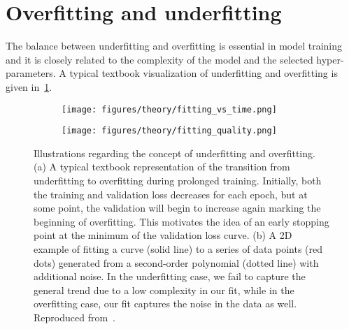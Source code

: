 \section{Overfitting and underfitting}\label{sec:under_over_fit}

The balance between underfitting and overfitting is essential in model training
and it is closely related to the complexity of the model and the selected
hyper-parameters. A typical textbook visualization of underfitting and
overfitting is given in~\cref{fig:fitting_vs_time}. 


\begin{figure}[!htb]
  \centering
  \begin{subfigure}[t]{0.42\textwidth}
    \centering
    \texttt{[image: figures/theory/fitting\_vs\_time.png]}
    \caption{}
    \label{fig:fitting_vs_time}
  \end{subfigure}
  \hfill
  \begin{subfigure}[t]{0.57\textwidth}
    \centering
    \texttt{[image: figures/theory/fitting\_quality.png]}
    \caption{}
    \label{fig:fitting_quality}
  \end{subfigure}
  \hfill
  \caption{Illustrations regarding the concept of underfitting and overfitting. (a) A typical textbook representation of the transition from underfitting to overfitting during prolonged training. Initially, both the training and validation loss decreases for each epoch, but at some point, the validation will begin to increase again marking the beginning of overfitting. This motivates the idea of an early stopping point at the minimum of the validation loss curve. (b) A 2D example of fitting a curve (solid line) to a series of data points (red dots) generated from a second-order polynomial (dotted line) with additional noise. In the underfitting case, we fail to capture the general trend due to a low complexity in our fit, while in the overfitting case, our fit captures the noise in the data as well. Reproduced from~\cite{kaggle}.}
  \label{fig:over_under_fitting}
\end{figure}


